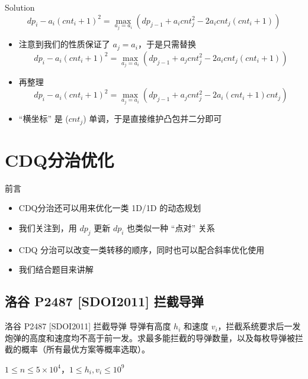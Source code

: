 ﻿\documentclass[aspectratio=169]{ctexbeamer}
\begin{document}
\begin{frame}{Solution}
    $$
        dp_i-a_i(cnt_i+1)^2=\max_{a_j=a_i}\left(dp_{j-1}+a_icnt_j^2-2a_icnt_j(cnt_i+1)\right)
    $$
    \begin{itemize}
        \item 注意到我们的性质保证了 $a_j=a_i$，于是只需替换
        $$
            dp_i-a_i(cnt_i+1)^2=\max_{a_j=a_i}\left(dp_{j-1}+a_jcnt_j^2-2a_icnt_j(cnt_i+1)\right)
        $$
        \item 再整理
        $$
            dp_i-a_i(cnt_i+1)^2=\max_{a_j=a_i}\left(dp_{j-1}+a_jcnt_j^2-2a_i(cnt_i+1)cnt_j\right)
        $$
        \item “横坐标” 是 ($cnt_j$) 单调，于是直接维护凸包并二分即可
    \end{itemize}
\end{frame}



















\section{CDQ分治优化}

\begin{frame}{前言}
    \begin{itemize}
        \item CDQ分治还可以用来优化一类 1D/1D 的动态规划
        \item 我们关注到，用 $dp_j$ 更新 $dp_i$ 也类似一种 “点对” 关系
        \item CDQ 分治可以改变一类转移的顺序，同时也可以配合斜率优化使用
        \item 我们结合题目来讲解
    \end{itemize}
\end{frame}

\subsection{洛谷 P2487 [SDOI2011] 拦截导弹}

\begin{frame}{洛谷 P2487 [SDOI2011] 拦截导弹}
      导弹有高度 $h_i$ 和速度 $v_i$，拦截系统要求后一发炮弹的高度和速度均不高于前一发。求最多能拦截的导弹数量，以及每枚导弹被拦截的概率（所有最优方案等概率选取）。
      
      $1\le n\le 5\times 10^4$，$1\le h_i,v_i\le 10^9$
\end{frame}
\end{document}
